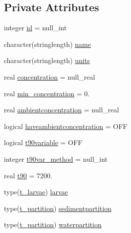 \subsection*{Private Attributes}
\begin{DoxyCompactItemize}
\item 
integer \mbox{\hyperlink{structmodulelagrangian_1_1t__property_a58636ee559df595ca7a57a76db5aab43}{id}} = null\+\_\+int
\item 
character(stringlength) \mbox{\hyperlink{structmodulelagrangian_1_1t__property_a21a6a59bc7d76e8e8149cecc3761354a}{name}}
\item 
character(stringlength) \mbox{\hyperlink{structmodulelagrangian_1_1t__property_aa61face0b2a32c3157a422cedb10d6dc}{units}}
\item 
real \mbox{\hyperlink{structmodulelagrangian_1_1t__property_a7016a40df39cc3f6b6e243fdf111bb2d}{concentration}} = null\+\_\+real
\item 
real \mbox{\hyperlink{structmodulelagrangian_1_1t__property_a3ab745dcd6ad12dac43c08b02ebedaf4}{min\+\_\+concentration}} = 0.
\item 
real \mbox{\hyperlink{structmodulelagrangian_1_1t__property_a11a09aace55f676fda00b00edabd704e}{ambientconcentration}} = null\+\_\+real
\item 
logical \mbox{\hyperlink{structmodulelagrangian_1_1t__property_ad436cf710391471037dd4fb7b82566a7}{haveambientconcentration}} = O\+FF
\item 
logical \mbox{\hyperlink{structmodulelagrangian_1_1t__property_a50736d4cebc778a4b12efe66185f7ef7}{t90variable}} = O\+FF
\item 
integer \mbox{\hyperlink{structmodulelagrangian_1_1t__property_a1b2e25019d179ab15e2fa6a2fb926960}{t90var\+\_\+method}} = null\+\_\+int
\item 
real \mbox{\hyperlink{structmodulelagrangian_1_1t__property_ae7bcde6c4cba6a989d03aa5c368e69e7}{t90}} = 7200.
\item 
type(\mbox{\hyperlink{structmodulelagrangian_1_1t__larvae}{t\+\_\+larvae}}) \mbox{\hyperlink{structmodulelagrangian_1_1t__property_a5f5a3d169202058ad9e3937026e6753a}{larvae}}
\item 
type(\mbox{\hyperlink{structmodulelagrangian_1_1t__partition}{t\+\_\+partition}}) \mbox{\hyperlink{structmodulelagrangian_1_1t__property_a5bebec4f379cd3ca9a1655e5a09ca2e5}{sedimentpartition}}
\item 
type(\mbox{\hyperlink{structmodulelagrangian_1_1t__partition}{t\+\_\+partition}}) \mbox{\hyperlink{structmodulelagrangian_1_1t__property_a13753fa031abebf088bdf3dfc2205287}{waterpartition}}

\end{DoxyCompactItemize}
